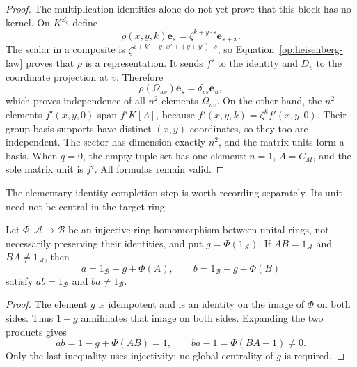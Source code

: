 \begin{proof}
The multiplication identities alone do not yet prove that this block
has no kernel. On $K^{Z_q}$ define
\[
 \rho(x,y,k)\mathbf e_s=\zeta^{k+y\cdot s}\mathbf e_{s+x}.
\]
The scalar in a composite is
$\zeta^{k+k'+y\cdot x'+(y+y')\cdot s}$, so
Equation~\eqref{op:heisenberg-law} proves that $\rho$ is a representation.
It sends $f'$ to the identity and $D_v$ to the coordinate projection
at $v$. Therefore
\[
 \rho(\Omega_{uv})\mathbf e_s=\delta_{vs}\mathbf e_u,
\]
which proves independence of all $n^2$ elements $\Omega_{uv}$.
On the other hand, the $n^2$ elements $f'(x,y,0)$ span $f'K[\Lambda]$,
because $f'(x,y,k)=\zeta^k f'(x,y,0)$. Their group-basis supports have
distinct $(x,y)$ coordinates, so they too are independent. The sector
has dimension exactly $n^2$, and the matrix units form a basis.
When $q=0$, the empty tuple set has one element: $n=1$, $\Lambda=C_M$,
and the sole matrix unit is $f'$. All formulas remain valid.
\end{proof}

The elementary identity-completion step is worth recording separately.
Its unit need not be central in the target ring.

\begin{lemma}\label{op:complement}
Let $\Phi:\mathcal A\to\mathcal B$ be an injective ring homomorphism
between unital rings, not necessarily preserving their identities, and
put $g=\Phi(1_{\mathcal A})$. If $AB=1_{\mathcal A}$ and
$BA\ne1_{\mathcal A}$, then
\[
 a=1_{\mathcal B}-g+\Phi(A),\qquad
 b=1_{\mathcal B}-g+\Phi(B)
\]
satisfy $ab=1_{\mathcal B}$ and $ba\ne1_{\mathcal B}$.
\end{lemma}
\begin{proof}
The element $g$ is idempotent and is an identity on the image of $\Phi$
on both sides. Thus $1-g$ annihilates that image on both sides. Expanding
the two products gives
\[
 ab=1-g+\Phi(AB)=1,\qquad
 ba-1=\Phi(BA-1)\ne0.
\]
Only the last inequality uses injectivity; no global centrality of $g$
is required.
\end{proof}

